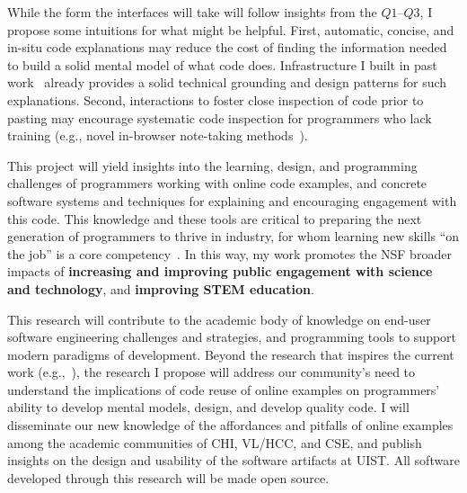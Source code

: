\documentclass[12pt]{memoir}
\begin{document}
While the form the interfaces will take will follow insights from the $Q1$--$Q3$, I propose some intuitions for what might be helpful.
First, automatic, concise, and in-situ code explanations may reduce the cost of finding the information needed to build a solid mental model of what code does.
Infrastructure I built in past work~\cite{head_tutorons_2015} already provides a solid technical grounding and design patterns for such explanations.
Second, interactions to foster close inspection of code prior to pasting may encourage systematic code inspection for programmers who lack training (e.g., novel in-browser note-taking methods~\cite{bauer_selection-based_2007}).

This project will yield insights into the learning, design, and programming challenges of programmers working with online code examples, and concrete software systems and techniques for explaining and encouraging engagement with this code.
This knowledge and these tools are critical to preparing the next generation of programmers to thrive in industry, for whom learning new skills ``on the job'' is a core competency~\cite{exter_exploring_2012}.
In this way, my work promotes the NSF broader impacts of \textbf{increasing and improving public engagement with science and technology}, and \textbf{improving STEM education}.

This research will contribute to the academic body of knowledge on end-user software engineering challenges and strategies, and programming tools to support modern paradigms of development.
Beyond the research that inspires the current work (e.g.,~\cite{brandt_two_2009,ichinco_exploring_2015}),
the research I propose will address our community's need to understand the implications of code reuse of online examples on programmers' ability to develop mental models, design, and develop quality code.
I will disseminate our new knowledge of the affordances and pitfalls of online examples among the academic communities of CHI, VL/HCC, and CSE\@, and publish insights on the design and usability of the software artifacts at UIST\@.
All software developed through this research will be made open source.

\printbibliography[heading=none]
\end{document}

